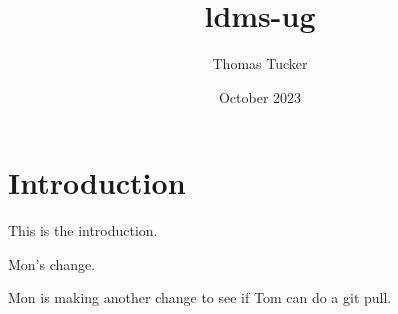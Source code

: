 \documentclass{article}
\title{ldms-ug}
\author{Thomas Tucker}
\date{October 2023}
\begin{document}
\maketitle

\section{Introduction}
This is the introduction.

Mon's change.

Mon is making another change to see if Tom can do a git pull.
\end{document}
